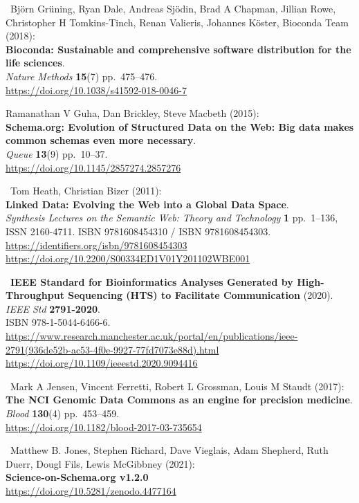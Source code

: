 \begin{thebibliography}{9}
~Björn Grüning, Ryan Dale, Andreas Sjödin, Brad A Chapman,
Jillian Rowe, Christopher H Tomkins-Tinch, Renan Valieris, Johannes
Köster, Bioconda Team (2018):\\
\textbf{Bioconda: Sustainable and comprehensive software distribution
for the life sciences}.\\
\emph{Nature Methods} \textbf{15}(7) pp.~475--476.\\
\url{https://doi.org/10.1038/s41592-018-0046-7}

 Ramanathan V Guha, Dan Brickley, Steve Macbeth (2015):\\
\textbf{Schema.org: Evolution of Structured Data on the Web: Big data
makes common schemas even more necessary}.\\
\emph{Queue} \textbf{13}(9) pp.~10--37.\\
\url{https://doi.org/10.1145/2857274.2857276}

~Tom Heath, Christian Bizer (2011):\\
\textbf{Linked Data: Evolving the Web into a Global Data Space}.\\
\emph{Synthesis Lectures on the Semantic Web: Theory and Technology}
\textbf{1} pp.~1--136, ISSN 2160-4711. ISBN 9781608454310 / ISBN
9781608454303. \url{https://identifiers.org/isbn/9781608454303}\\
\url{https://doi.org/10.2200/S00334ED1V01Y201102WBE001}

~\textbf{IEEE Standard for Bioinformatics Analyses Generated by
High-Throughput Sequencing (HTS) to Facilitate Communication} (2020).\\
\emph{IEEE Std} \textbf{2791-2020}.\\
ISBN 978-1-5044-6466-6.\\
\url{https://www.research.manchester.ac.uk/portal/en/publications/ieee-2791(936de52b-ac53-4f0e-9927-77fd7073e88d).html}~\\
\url{https://doi.org/10.1109/ieeestd.2020.9094416}

~Mark A Jensen, Vincent Ferretti, Robert L Grossman, Louis M
Staudt (2017):\\
\textbf{The NCI Genomic Data Commons as an engine for precision
medicine}.\\
\emph{Blood} \textbf{130}(4) pp.~453--459.\\
\url{https://doi.org/10.1182/blood-2017-03-735654}

~Matthew B. Jones, Stephen Richard, Dave Vieglais, Adam
Shepherd, Ruth Duerr, Dougl Fils, Lewis McGibbney (2021):\\
\textbf{Science-on-Schema.org v1.2.0}\\
\url{https://doi.org/10.5281/zenodo.4477164}


\end{thebibliography}
